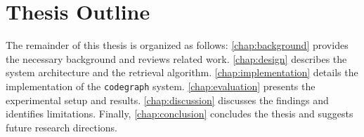 \section{Thesis Outline}
\label{sec:outline}
The remainder of this thesis is organized as follows:
\cref{chap:background} provides the necessary background and reviews related work.
\cref{chap:design} describes the system architecture and the retrieval algorithm.
\cref{chap:implementation} details the implementation of the \texttt{codegraph} system.
\cref{chap:evaluation} presents the experimental setup and results.
\cref{chap:discussion} discusses the findings and identifies limitations.
Finally, \cref{chap:conclusion} concludes the thesis and suggests future research directions.
